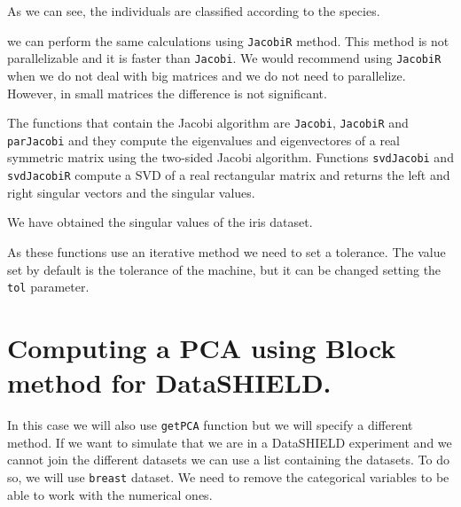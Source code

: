 \documentclass[]{article}
\newenvironment{Shaded}{\begin{snugshade}}{\end{snugshade}}
\newcommand{\KeywordTok}[1]{\textcolor[rgb]{0.13,0.29,0.53}{\textbf{#1}}}
\newcommand{\FloatTok}[1]{\textcolor[rgb]{0.00,0.00,0.81}{#1}}
\newcommand{\StringTok}[1]{\textcolor[rgb]{0.31,0.60,0.02}{#1}}
\newcommand{\OperatorTok}[1]{\textcolor[rgb]{0.81,0.36,0.00}{\textbf{#1}}}
\newcommand{\NormalTok}[1]{#1}
\begin{document}
As we can see, the individuals are classified according to the species.

we can perform the same calculations using \texttt{JacobiR} method. This
method is not parallelizable and it is faster than \texttt{Jacobi}. We
would recommend using \texttt{JacobiR} when we do not deal with big
matrices and we do not need to parallelize. However, in small matrices
the difference is not significant.

The functions that contain the Jacobi algorithm are \texttt{Jacobi},
\texttt{JacobiR} and \texttt{parJacobi} and they compute the eigenvalues
and eigenvectores of a real symmetric matrix using the two-sided Jacobi
algorithm. Functions \texttt{svdJacobi} and \texttt{svdJacobiR} compute
a SVD of a real rectangular matrix and returns the left and right
singular vectors and the singular values.

\begin{Shaded}
\end{Shaded}

We have obtained the singular values of the iris dataset.

As these functions use an iterative method we need to set a tolerance.
The value set by default is the tolerance of the machine, but it can be
changed setting the \texttt{tol} parameter.

\section{Computing a PCA using Block method for
DataSHIELD.}\label{computing-a-pca-using-block-method-for-datashield.}

In this case we will also use \texttt{getPCA} function but we will
specify a different method. If we want to simulate that we are in a
DataSHIELD experiment and we cannot join the different datasets we can
use a list containing the datasets. To do so, we will use
\texttt{breast} dataset. We need to remove the categorical variables to
be able to work with the numerical ones.
\end{document}
